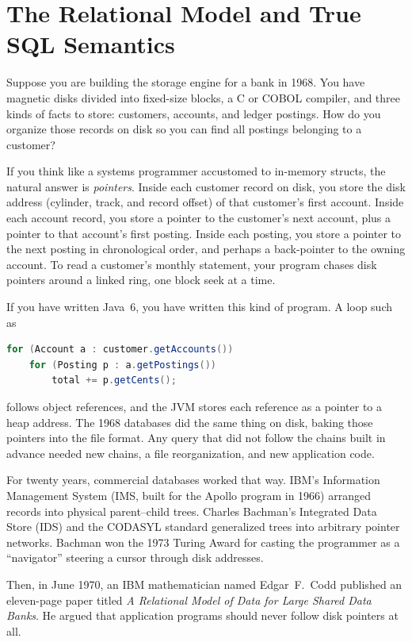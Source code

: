 \chapter{The Relational Model and True SQL Semantics}
\label{ch:relational-sql}

Suppose you are building the storage engine for a bank in 1968. You have magnetic disks divided into fixed-size blocks, a C or COBOL compiler, and three kinds of facts to store: customers, accounts, and ledger postings. How do you organize those records on disk so you can find all postings belonging to a customer?

If you think like a systems programmer accustomed to in-memory structs, the natural answer is \emph{pointers}. Inside each customer record on disk, you store the disk address (cylinder, track, and record offset) of that customer's first account. Inside each account record, you store a pointer to the customer's next account, plus a pointer to that account's first posting. Inside each posting, you store a pointer to the next posting in chronological order, and perhaps a back-pointer to the owning account. To read a customer's monthly statement, your program chases disk pointers around a linked ring, one block seek at a time.

If you have written Java~6, you have written this kind of program. A loop such as
\begin{lstlisting}[language=Java]
for (Account a : customer.getAccounts())
    for (Posting p : a.getPostings())
        total += p.getCents();
\end{lstlisting}
follows object references, and the JVM stores each reference as a pointer to a heap address. The 1968 databases did the same thing on disk, baking those pointers into the file format. Any query that did not follow the chains built in advance needed new chains, a file reorganization, and new application code.

For twenty years, commercial databases worked that way. IBM's Information Management System (IMS, built for the Apollo program in 1966) arranged records into physical parent--child trees. Charles Bachman's Integrated Data Store (IDS) and the CODASYL standard generalized trees into arbitrary pointer networks. Bachman won the 1973 Turing Award for casting the programmer as a ``navigator'' steering a cursor through disk addresses.

Then, in June 1970, an IBM mathematician named Edgar~F.\ Codd published an eleven-page paper titled \emph{A Relational Model of Data for Large Shared Data Banks}. He argued that application programs should never follow disk pointers at all.

